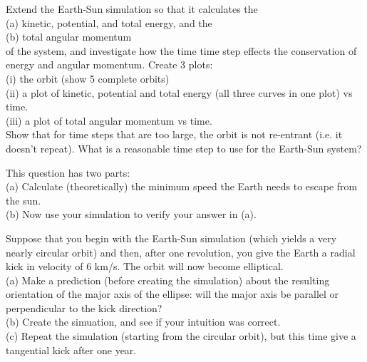 \begin{prob} \label{energy}
Extend the Earth-Sun simulation so that it calculates the \\
(a) kinetic, potential, and total energy, and the\\
(b) total angular momentum \\
of the system, and investigate how the time time step effects the conservation of energy and angular momentum. Create 3 plots:\\
(i) the orbit (show 5 complete orbits)\\
(ii) a plot of kinetic, potential and total energy (all three curves in one plot) vs time.\\ 
(iii) a plot of total angular momentum vs time.\\
Show that for time steps that are too large, the orbit is not re-entrant (i.e. it doesn't repeat). What is a reasonable time step to use for the Earth-Sun system?
\end{prob}



\begin{prob} \label{escape}
This question has two parts:\\
(a) Calculate (theoretically) the minimum speed the Earth needs to escape from the sun.\\
(b) Now use your simulation to verify your answer in (a).
\end{prob}


\begin{prob} \label{intuition}
Suppose that you begin with the Earth-Sun simulation (which yields a very nearly circular orbit) and then, after one revolution, you give the Earth a radial kick in velocity of 6 km/s. The orbit will now become elliptical. \\
(a) Make a prediction (before creating the simulation) about the resulting orientation of the major axis of the ellipse: will the major axis be parallel or perpendicular to the kick direction?\\
(b) Create the simuation, and see if your intuition was correct. \\
(c) Repeat the simulation (starting from the circular orbit), but this time give a tangential kick after one year.
\end{prob}
